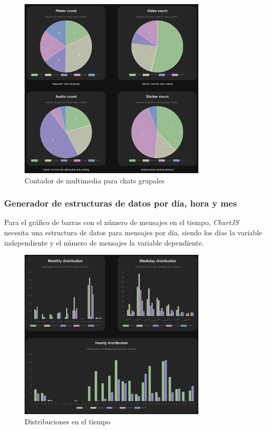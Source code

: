 \begin{figure}[h]
	\centering
	\includegraphics[width=0.8\textwidth]{img/media_count.png}
	\caption{Contador de multimedia para chats grupales}
	\label{fig:chap4:media_count}
\end{figure}

\subsubsection{Generador de estructuras de datos por día, hora y mes}

Para el gráfico de barras con el número de mensajes en el tiempo, \textit{ChartJS} necesita una estructura de datos para mensajes por día, siendo los días la variable independiente y el número de mensajes la variable dependiente.

\begin{figure}[H]
	\centering
	\includegraphics[width=0.8\textwidth]{img/time_distributions.png}
	\caption{Distribuciones en el tiempo}
	\label{fig:chap4:time_distributions}
\end{figure}

